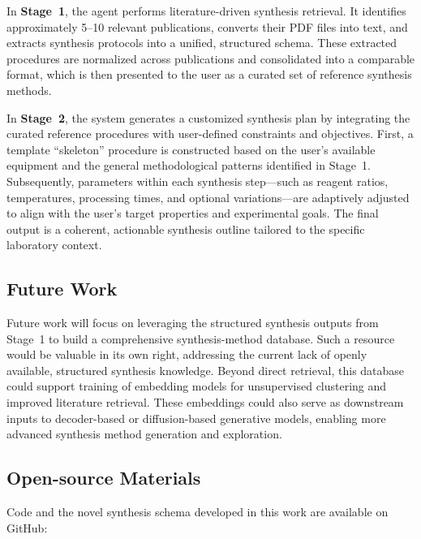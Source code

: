 In \textbf{Stage~1}, the agent performs literature-driven synthesis retrieval. It identifies approximately 5--10 relevant publications, converts their PDF files into text, and extracts synthesis protocols into a unified, structured schema. These extracted procedures are normalized across publications and consolidated into a comparable format, which is then presented to the user as a curated set of reference synthesis methods.

In \textbf{Stage~2}, the system generates a customized synthesis plan by integrating the curated reference procedures with user-defined constraints and objectives. First, a template ``skeleton'' procedure is constructed based on the user’s available equipment and the general methodological patterns identified in Stage~1. Subsequently, parameters within each synthesis step—such as reagent ratios, temperatures, processing times, and optional variations—are adaptively adjusted to align with the user’s target properties and experimental goals. The final output is a coherent, actionable synthesis outline tailored to the specific laboratory context.


\subsection*{Future Work}

Future work will focus on leveraging the structured synthesis outputs from Stage~1 to build a comprehensive synthesis-method database. Such a resource would be valuable in its own right, addressing the current lack of openly available, structured synthesis knowledge. Beyond direct retrieval, this database could support training of embedding models for unsupervised clustering and improved literature retrieval. These embeddings could also serve as downstream inputs to decoder-based or diffusion-based generative models, enabling more advanced synthesis method generation and exploration.

\subsection*{Open-source Materials}

Code and the novel synthesis schema developed in this work are available on GitHub: 

